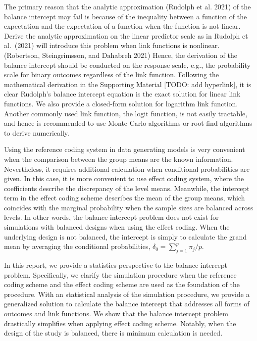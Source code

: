 \documentclass[
]{article}
\begin{document}
The primary reason that the analytic approximation (Rudolph et al. 2021)
of the balance intercept may fail is because of the inequality between a
function of the expectation and the expectation of a function when the
function is not linear. Derive the analytic approximation on the linear
predictor scale as in Rudolph et al.~(2021) will introduce this problem
when link functions is nonlinear. (Robertson, Steingrimsson, and
Dahabreh 2021) Hence, the derivation of the balance intercept should be
conducted on the response scale, e.g., the probability scale for binary
outcomes regardless of the link function. Following the mathematical
derivation in the Supporting Material {[}TODO: add hyperlink{]}, it is
clear Rudolph's balance intercept equation is the exact solution for
linear link functions. We also provide a closed-form solution for
logarithm link function. Another commonly used link function, the logit
function, is not easily tractable, and hence is recommended to use Monte
Carlo algorithms or root-find algorithms to derive numerically.

Using the reference coding system in data generating models is very
convenient when the comparison between the group means are the known
information. Nevertheless, it requires additional calculation when
conditional probabilities are given. In this case, it is more convenient
to use effect coding system, where the coefficients describe the
discrepancy of the level means. Meanwhile, the intercept term in the
effect coding scheme describes the mean of the group means, which
coincides with the marginal probability when the sample sizes are
balanced across levels. In other words, the balance intercept problem
does not exist for simulations with balanced designs when using the
effect coding. When the underlying design is not balanced, the intercept
is simply to calculate the grand mean by averaging the conditional
probabilities, \(\delta_0 = \sum\limits_{j=1}^p \pi_j /p\).

In this report, we provide a statistics perspective to the balance
intercept problem. Specifically, we clarify the simulation procedure
when the reference coding scheme and the effect coding scheme are used
as the foundation of the procedure. With an statistical analysis of the
simulation procedure, we provide a generalized solution to calculate the
balance intercept that addresses all forms of outcomes and link
functions. We show that the balance intercept problem drastically
simplifies when applying effect coding scheme. Notably, when the design
of the study is balanced, there is minimum calculation is needed.
\end{document}
